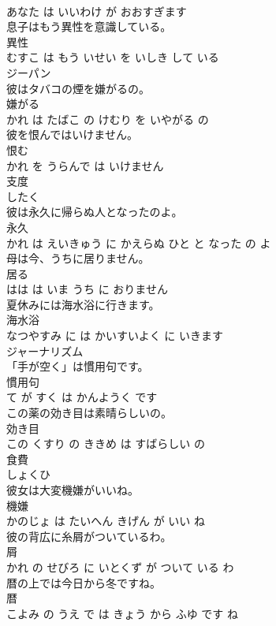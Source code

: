 \documentclass[8pt]{extreport}
\begin{document}
\begin{CJK}{UTF8}{min}
\\	あなた は いいわけ が おおすぎます			
\\	息子はもう異性を意識している。	
\\	異性 
\\	むすこ は もう いせい を いしき して いる			
\\	ジーパン	
\\	彼はタバコの煙を嫌がるの。	
\\	嫌がる 
\\	かれ は たばこ の けむり を いやがる の			
\\	彼を恨んではいけません。	
\\	恨む 
\\	かれ を うらんで は いけません			
\\	支度	
\\	したく			
\\	彼は永久に帰らぬ人となったのよ。	
\\	永久 
\\	かれ は えいきゅう に かえらぬ ひと と なった の よ			
\\	母は今、うちに居りません。	
\\	居る 
\\	はは は いま うち に おりません			
\\	夏休みには海水浴に行きます。	
\\	海水浴 
\\	なつやすみ に は かいすいよく に いきます			
\\	ジャーナリズム	
\\	「手が空く」は慣用句です。	
\\	慣用句 
\\	て が すく は かんようく です			
\\	この薬の効き目は素晴らしいの。	
\\	効き目 
\\	この くすり の ききめ は すばらしい の			
\\	食費	
\\	しょくひ			
\\	彼女は大変機嫌がいいね。	
\\	機嫌 
\\	かのじょ は たいへん きげん が いい ね			
\\	彼の背広に糸屑がついているわ。	
\\	屑 
\\	かれ の せびろ に いとくず が ついて いる わ			
\\	暦の上では今日から冬ですね。	
\\	暦 
\\	こよみ の うえ で は きょう から ふゆ です ね			

\end{CJK}
\end{document}

